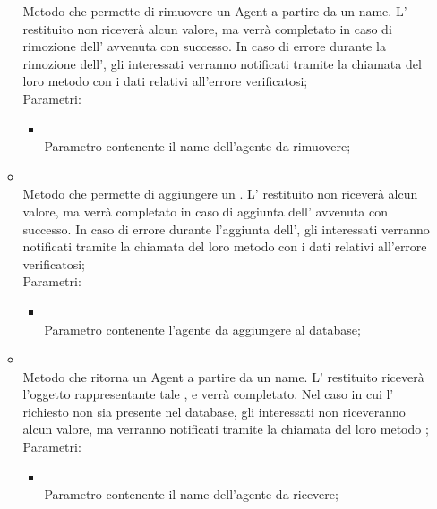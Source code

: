 \begin{itemize}
\begin{itemize}
		Metodo che permette di rimuovere un Agent a partire da un name.  L' restituito non riceverà alcun valore, ma verrà completato in caso di rimozione dell' avvenuta con successo. In caso di errore durante la rimozione dell', gli  interessati verranno notificati tramite la chiamata del loro metodo  con i dati relativi all'errore verificatosi;\\
		Parametri:
		\begin{itemize}
			\item {} \\
			Parametro contenente il name dell'agente da rimuovere;
		\end{itemize}
		\item[]  \\
		Metodo che permette di aggiungere un .  L' restituito non riceverà alcun valore, ma verrà completato in caso di aggiunta dell' avvenuta con successo. In caso di errore durante l'aggiunta dell', gli  interessati verranno notificati tramite la chiamata del loro metodo  con i dati relativi all'errore verificatosi;\\
		Parametri:
		\begin{itemize}
			\item {} \\
			Parametro contenente l'agente da aggiungere al database;
		\end{itemize}
		\item[]  \\
		Metodo che ritorna un Agent a partire da un name. L' restituito riceverà l'oggetto rappresentante tale , e verrà completato. Nel caso in cui l' richiesto non sia presente nel database, gli  interessati non riceveranno alcun valore, ma verranno notificati tramite la chiamata del loro metodo ;\\
		Parametri:
		\begin{itemize}
			\item {} \\
			Parametro contenente il name dell'agente da ricevere;
		\end{itemize}
	\end{itemize}
\end{itemize}
\FloatBarrier

